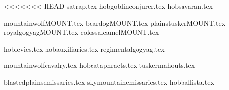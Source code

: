 
<<<<<<< HEAD
{satrap.tex}
{hobgoblinconjurer.tex}
{hobsavaran.tex}

\clearpage
{}
{mountainwolfMOUNT.tex}
{beardogMOUNT.tex}
{plainstuskerMOUNT.tex}
{royalgogyagMOUNT.tex}
{colossalcamelMOUNT.tex}

\clearpage
{}
{hoblevies.tex}
{hobauxiliaries.tex}
{regimentalgogyag.tex}

\clearpage
{}
{mountainwolfcavalry.tex}
{hobcataphracts.tex}
{tuskermahouts.tex}



\clearpage
{}
{blastedplainsemissaries.tex}
{skymountainemissaries.tex}
{hobballista.tex}
